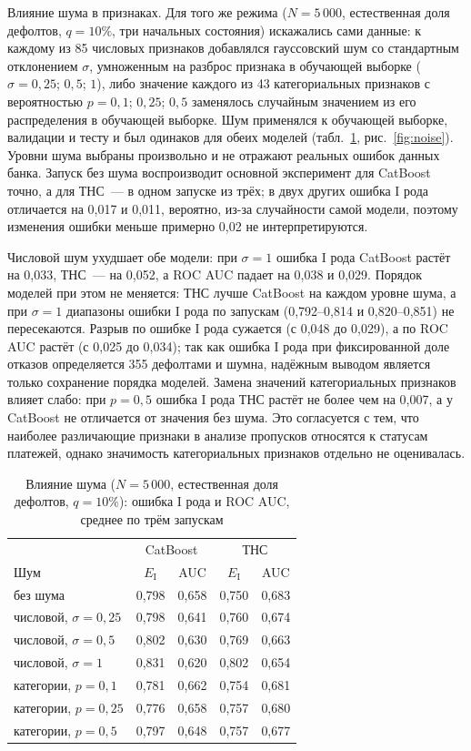 \documentclass{misisarticle}
\begin{document}
Влияние шума в признаках. Для того же режима ($N=5\,000$, естественная доля дефолтов, $q=10\%$, три начальных состояния) искажались сами данные: к каждому из 85 числовых признаков добавлялся гауссовский шум со стандартным отклонением $\sigma$, умноженным на разброс признака в обучающей выборке ($\sigma=0{,}25$; $0{,}5$; $1$), либо значение каждого из 43 категориальных признаков с вероятностью $p=0{,}1$; $0{,}25$; $0{,}5$ заменялось случайным значением из его распределения в обучающей выборке. Шум применялся к обучающей выборке, валидации и тесту и был одинаков для обеих моделей (табл.~\ref{tab:noise}, рис.~\ref{fig:noise}). Уровни шума выбраны произвольно и не отражают реальных ошибок данных банка. Запуск без шума воспроизводит основной эксперимент для CatBoost точно, а для ТНС~--- в одном запуске из трёх; в двух других ошибка I рода отличается на 0,017 и 0,011, вероятно, из-за случайности самой модели, поэтому изменения ошибки меньше примерно 0,02 не интерпретируются.

Числовой шум ухудшает обе модели: при $\sigma=1$ ошибка I рода CatBoost растёт на 0,033, ТНС~--- на 0,052, а ROC AUC падает на 0,038 и 0,029. Порядок моделей при этом не меняется: ТНС лучше CatBoost на каждом уровне шума, а при $\sigma=1$ диапазоны ошибки I рода по запускам (0,792--0,814 и 0,820--0,851) не пересекаются. Разрыв по ошибке I рода сужается (с 0,048 до 0,029), а по ROC AUC растёт (с 0,025 до 0,034); так как ошибка I рода при фиксированной доле отказов определяется 355 дефолтами и шумна, надёжным выводом является только сохранение порядка моделей. Замена значений категориальных признаков влияет слабо: при $p=0{,}5$ ошибка I рода ТНС растёт не более чем на 0,007, а у CatBoost не отличается от значения без шума. Это согласуется с тем, что наиболее различающие признаки в анализе пропусков относятся к статусам платежей, однако значимость категориальных признаков отдельно не оценивалась.

\begin{table}[t]
\caption{Влияние шума ($N=5\,000$, естественная доля дефолтов, $q=10\%$): ошибка I рода и ROC AUC, среднее по трём запускам}
\label{tab:noise}
\centering
\small
\setlength{\tabcolsep}{3pt}
\begin{tabular}{lcccc}
\toprule
 & \multicolumn{2}{c}{CatBoost} & \multicolumn{2}{c}{ТНС} \\
Шум & $E_{\mathrm{I}}$ & AUC & $E_{\mathrm{I}}$ & AUC \\
\midrule
без шума & 0,798 & 0,658 & 0,750 & 0,683 \\
числовой, $\sigma=0{,}25$ & 0,798 & 0,641 & 0,760 & 0,674 \\
числовой, $\sigma=0{,}5$ & 0,802 & 0,630 & 0,769 & 0,663 \\
числовой, $\sigma=1$ & 0,831 & 0,620 & 0,802 & 0,654 \\
категории, $p=0{,}1$ & 0,781 & 0,662 & 0,754 & 0,681 \\
категории, $p=0{,}25$ & 0,776 & 0,658 & 0,757 & 0,680 \\
категории, $p=0{,}5$ & 0,797 & 0,648 & 0,757 & 0,677 \\
\bottomrule
\end{tabular}
\end{table}
\end{document}
